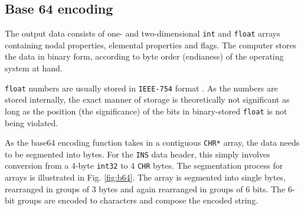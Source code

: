 \subsection{Base 64 encoding}
\label{subsec:b64encoding}


The output data consists of one- and two-dimensional \lstinline{int} and \lstinline{float} arrays containing nodal properties, elemental properties and flags. The computer stores the data in binary form, according to byte order (endianess) of the operating system at hand.

\bigbreak
\lstinline{float} numbers are usually stored in \texttt{IEEE-754} format \cite{Asp14}. As the numbers are stored internally, the exact manner of storage is theoretically not significant as long as the position (the significance) of the bits in binary-stored \lstinline{float} is not being violated.   

\bigbreak
As the base64 encoding function takes in a contiguous \lstinline{CHR*} array, the data needs to be segmented into bytes. For the \lstinline{INS} data header, this simply involves conversion from a 4-byte \lstinline{int32} to 4 \lstinline{CHR} bytes. The segmentation process for arrays is illustrated in Fig. \ref{fig:b64}. The array is segmented into single bytes, rearranged in groups of 3 bytes and again rearranged in groups of 6 bits. The 6-bit groups are encoded to characters and compose the encoded string. 

